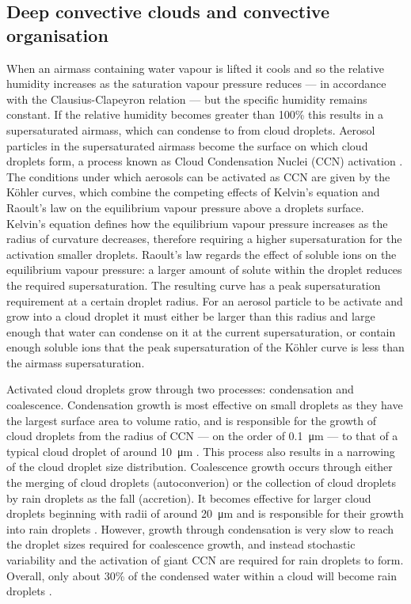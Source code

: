 \subsection{Deep convective clouds and convective organisation}

When an airmass containing water vapour is lifted it cools and so the relative humidity increases as the saturation vapour pressure reduces --- in accordance with the Clausius-Clapeyron relation --- but the specific humidity remains constant. 
If the relative humidity becomes greater than 100\% this results in a supersaturated airmass, which can condense to from cloud droplets.
Aerosol particles  in the supersaturated airmass become the surface on which cloud droplets form, a process known as Cloud Condensation Nuclei (CCN) activation \citep{acci}.
The conditions under which aerosols can be activated as CCN are given by the K{\"o}hler curves, which combine the competing effects of Kelvin's equation and Raoult's law on the equilibrium vapour pressure above a droplets surface. 
Kelvin's equation defines how the equilibrium vapour pressure increases as the radius of curvature decreases, therefore requiring a higher supersaturation for the activation smaller droplets. 
Raoult's law regards the effect of soluble ions on the equilibrium vapour pressure: a larger amount of solute within the droplet reduces the required supersaturation. The resulting curve has a peak supersaturation requirement at a certain droplet radius. 
For an aerosol particle to be activate and grow into a cloud droplet it must either be larger than this radius and large enough that water can condense on it at the current supersaturation, or contain enough soluble ions that the peak supersaturation of the K{\"o}hler curve is less than the airmass supersaturation.

Activated cloud droplets grow through two processes: condensation and coalescence. 
Condensation growth is most effective on small droplets as they have the largest surface area to volume ratio, and is responsible for the growth of cloud droplets from the radius of CCN --- on the order of \SI{0.1}{\micro\meter} --- to that of a typical cloud droplet of around \SI{10}{\micro\meter} \citep{cloud_physics}. 
This process also results in a narrowing of the cloud droplet size distribution. 
Coalescence growth occurs through either the merging of cloud droplets (autoconverion) or the collection of cloud droplets by rain droplets as the fall (accretion).
It becomes effective for larger cloud droplets beginning with radii of around \SI{20}{\micro\meter} and is responsible for their growth into rain droplets \citep{cloud_physics}.
However, growth through condensation is very slow to reach the droplet sizes required for coalescence growth, and instead stochastic variability and the activation of giant CCN \citep{feingold_impact_1999} are required for rain droplets to form. 
Overall, only about 30\% of the condensed water within a cloud will become rain droplets \citep{trenberth_changing_2003}.

